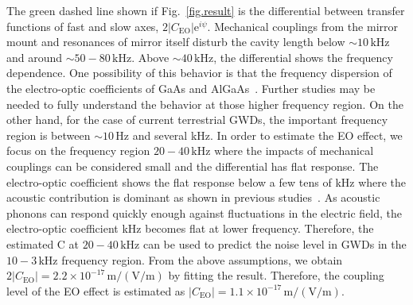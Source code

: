 The green dashed line shown if Fig.~\ref{fig.result} is the differential between transfer functions of fast and slow axes, $2|C_{\mathrm{EO}}|\mathrm{e}^{i\psi}$.
Mechanical couplings from the mirror mount and resonances of mirror itself disturb the cavity length below $\sim10{\, \mathrm{kHz}}$ and around $\sim50 - 80\, \mathrm{kHz}$.
Above $\sim40\, \mathrm{kHz}$, the differential shows the frequency dependence.
One possibility of this behavior is that the frequency dispersion of the electro-optic coefficients of GaAs and AlGaAs~\cite{salvestrini:2003}.
Further studies may be needed to fully understand the behavior at those higher frequency region.
On the other hand, for the case of current terrestrial GWDs, the important frequency region is between $\sim10\, \mathrm{Hz}$ and several kHz.
In order to estimate the EO effect, we focus on the frequency region $20-40\, \mathrm{kHz}$ where the impacts of mechanical couplings can be considered small and the differential has flat response.
The electro-optic coefficient shows the flat response below a few tens of kHz where the acoustic contribution is dominant as shown in previous studies~\cite{Spreiter1997,Bosshard2002}.
As acoustic phonons can respond quickly enough against fluctuations in the electric field, the electro-optic coefficient kHz becomes flat at lower frequency.
Therefore, the estimated C at $20-40\, \mathrm{kHz}$ can be used to predict the noise level in GWDs in the $10 - 3\, \mathrm{kHz}$ frequency region. 
From the above assumptions, we obtain $2|C_{\mathrm{EO}}|= 2.2\times10^{-17}\, \mathrm{m/(V/m)}$ by fitting the result.
Therefore, the coupling level of the EO effect is estimated as $|C_{\mathrm{EO}}|=1.1\times10^{-17}\, \mathrm{m/(V/m)}$.


